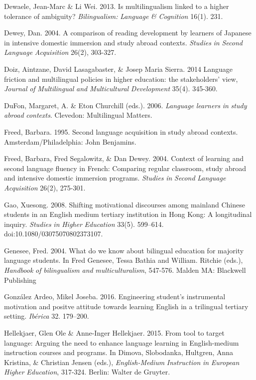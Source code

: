 Dewaele, Jean-Marc \& Li Wei. 2013. Is multilingualism linked to a higher tolerance of ambiguity? \textit{Bilingualism:} \textit{Language} \textit{\&} \textit{Cognition} 16(1). 231.

Dewey, Dan. 2004. A comparison of reading development by learners of Japanese in intensive domestic immersion and study abroad contexts. \textit{Studies} \textit{in} \textit{Second} \textit{Language} \textit{Acquisition} 26(2), 303-327.

Doiz, Aintzane, David Lasagabaster, \& Josep Maria Sierra. 2014 Language friction and multilingual policies in higher education: the stakeholders' view, \textit{Journal} \textit{of} \textit{Multilingual} \textit{and} \textit{Multicultural} \textit{Development} 35(4). 345-360.

DuFon, Margaret, A. \& Eton Churchill (eds.). 2006. \textit{Language} \textit{learners} \textit{in} \textit{study} \textit{abroad} \textit{contexts}. Clevedon: Multilingual Matters.

Freed, Barbara. 1995. Second language acquisition in study abroad contexts. Amsterdam/Philadelphia: John Benjamins. 

Freed, Barbara, Fred Segalowitz, \& Dan Dewey. 2004. Context of learning and second language fluency in French: Comparing regular classroom, study abroad and intensive domestic immersion programs. \textit{Studies} \textit{in} \textit{Second} \textit{Language} \textit{Acquisition} 26(2), 275-301.

Gao, Xuesong. 2008. Shifting motivational discourses among mainland Chinese students in an English medium tertiary institution in Hong Kong: A longitudinal inquiry. \textit{Studies} \textit{in} \textit{Higher} \textit{Education} 33(5). 599–614. doi:10.1080/03075070802373107.

Genesee, Fred. 2004. What do we know about bilingual education for majority language students. In Fred Genesee, Tessa Bathia and William. Ritchie (eds.), \textit{Handbook} \textit{of} \textit{bilingualism} \textit{and} \textit{multiculturalism}, 547-576. Malden MA: Blackwell Publishing

González Ardeo, Mikel Joseba. 2016. Engineering student’s instrumental motivation and positve attitude towards learning English in a trilingual tertiary setting. \textit{Ibérica} 32. 179–200.

Hellekjaer, Glen Ole \& Anne-Inger Hellekjaer. 2015. From tool to target language: Arguing the need to enhance language learning in English-medium instruction courses and programs. In Dimova, Slobodanka, Hultgren, Anna Kristina, \& Christian Jensen (eds.), \textit{English-Medium} \textit{Instruction} \textit{in} \textit{European} \textit{Higher} \textit{Education}, 317-324. Berlin: Walter de Gruyter. 

